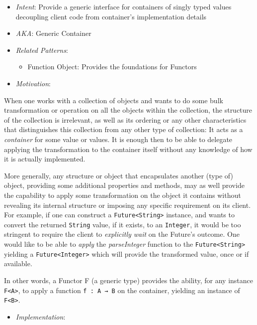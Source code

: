 \documentclass[11pt,]{article}
\begin{document}
\begin{itemize}
\item
  \emph{Intent}: Provide a generic interface for containers of singly
  typed values decoupling client code from container's implementation
  details
\item
  \emph{AKA}: Generic Container
\item
  \emph{Related Patterns}:

  \begin{itemize}
  \item
    Function Object: Provides the foundations for Functors
  \end{itemize}
\item
  \emph{Motivation}:
\end{itemize}

When one works with a collection of objects and wants to do some bulk
transformation or operation on all the objects within the collection,
the structure of the collection is irrelevant, as well as its ordering
or any other characteristics that distinguishes this collection from any
other type of collection: It acts as a \emph{container} for some value
or values. It is enough then to be able to delegate applying the
transformation to the container itself without any knowledge of how it
is actually implemented.

More generally, any structure or object that encapsulates another (type
of) object, providing some additional properties and methods, may as
well provide the capability to apply some transformation on the object
it contains without revealing its internal structure or imposing any
specific requirement on its client. For example, if one can construct a
\texttt{Future\textless{}String\textgreater{}} instance, and wants to
convert the returned \texttt{String} value, if it exists, to an
\texttt{Integer}, it would be too stringent to require the client to
\emph{explicitly wait} on the Future's outcome. One would like to be
able to \emph{apply} the \emph{parseInteger} function to the
\texttt{Future\textless{}String\textgreater{}} yielding a
\texttt{Future\textless{}Integer\textgreater{}} which will provide the
transformed value, once or if available.

In other words, a Functor F (a generic type) provides the ability, for
any instance \texttt{F\textless{}A\textgreater{}}, to apply a function
\texttt{f : A → B} on the container, yielding an instance of
\texttt{F\textless{}B\textgreater{}}.

\begin{itemize}
\item
  \emph{Implementation}:
\end{itemize}
\end{document}
